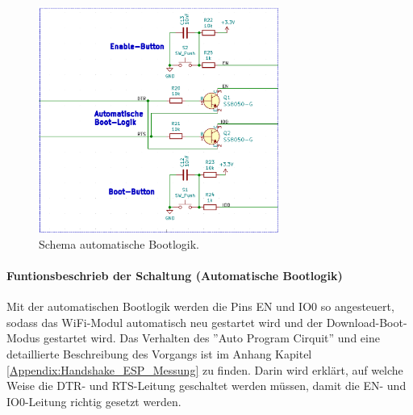 \begin{figure}[H]
	\centering
	\includegraphics[width=0.7\textwidth]{graphics/Schema_ESP32_Flashbuttons}
	\caption{Schema automatische Bootlogik.}
	\label{fig:Schema_ESP32_Flashbuttons}
\end{figure}

\paragraph{Funtionsbeschrieb der Schaltung (Automatische Bootlogik)}\mbox{}

Mit der automatischen Bootlogik werden die Pins EN und IO0 so angesteuert, sodass das WiFi-Modul automatisch neu gestartet wird und der Download-Boot-Modus gestartet wird. Das Verhalten des ''Auto Program Cirquit'' und eine detaillierte Beschreibung des Vorgangs ist im Anhang Kapitel \ref{Appendix:Handshake_ESP_Messung} zu finden. Darin wird erklärt, auf welche Weise die DTR- und RTS-Leitung geschaltet werden müssen, damit die EN- und IO0-Leitung richtig gesetzt werden.